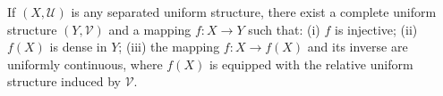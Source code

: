 If $(X, \mathcal{U})$ is any separated uniform structure, there exist a complete uniform structure $(Y, \mathcal{V})$ and a mapping $f: X \rightarrow Y$ such that: (i) $f$ is injective; (ii) $f(X)$ is dense in $Y$; (iii) the mapping $f: X \rightarrow f(X)$ and its inverse are uniformly continuous, where $f(X)$ is equipped with the relative uniform structure induced by $\mathcal{V}$.